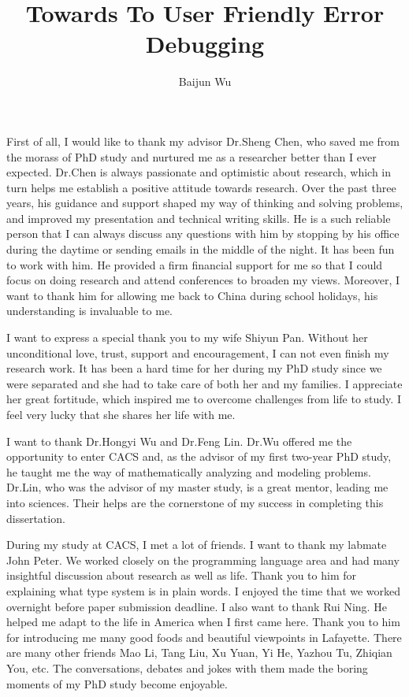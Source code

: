 \documentclass[12pt]{report}	%
\author{Baijun Wu}
\title{Towards To User Friendly Error Debugging}
\begin{document}
\titlepage              %

\copyrightpage          %

\approvalpage           %

%
%
%

\begin{acknowledgments}		%

First of all, I would like to thank my advisor Dr.Sheng Chen, 
who saved me from the morass of PhD study and nurtured me as a researcher better than I ever expected.
%
Dr.Chen is always passionate and optimistic about research,
which in turn helps me establish a positive attitude towards research.
Over the past three years, his guidance and support shaped my way of thinking and solving problems,
and improved my presentation and technical writing skills.
%
He is a such reliable person that I can always discuss any questions with him 
by stopping by his office during the daytime or sending emails in the middle of the night.
It has been fun to work with him.
%
He provided a firm financial support for me 
so that I could focus on doing research and attend conferences to broaden my views.
Moreover, I want to thank him for allowing me back to China during school holidays,
his understanding is invaluable to me.

I want to express a special thank you to my wife Shiyun Pan.
Without her unconditional love, trust, support and encouragement,
I can not even finish my research work.
%
It has been a hard time for her during my PhD study since we were separated
and she had to take care of both her and my families.
I appreciate her great fortitude, which inspired me to overcome challenges from life to study. 
I feel very lucky that she shares her life with me.

I want to thank Dr.Hongyi Wu and Dr.Feng Lin.
Dr.Wu offered me the opportunity to enter CACS and,
as the advisor of my first two-year PhD study, 
he taught me the way of mathematically analyzing and modeling problems.
Dr.Lin, who was the advisor of my master study, is a great mentor, leading me into sciences.
Their helps are the cornerstone of my success in completing this dissertation.

During my study at CACS, I met a lot of friends. I want to thank my labmate John Peter.
We worked closely on the programming language area and had many insightful discussion about research as well as life.
Thank you to him for explaining what type system is in plain words.
I enjoyed the time that we worked overnight before paper submission deadline.
%
I also want to thank Rui Ning.
He helped me adapt to the life in America when I first came here.
Thank you to him for introducing me many good foods and beautiful viewpoints in Lafayette.
%
There are many other friends Mao Li, Tang Liu, Xu Yuan, Yi He, Yazhou Tu, Zhiqian You, etc.
The conversations, debates and jokes with them made the boring moments of my PhD study become enjoyable. 



\end{acknowledgments}
\end{document}
